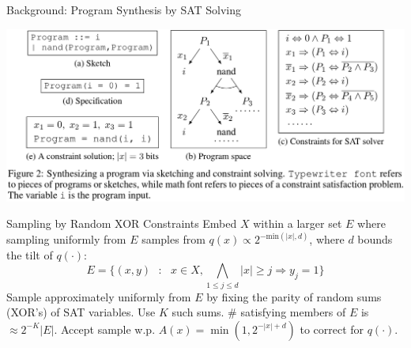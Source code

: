 \documentclass[final]{beamer}
\newlength{\onecolwid}
\newlength{\twocolwid}
\begin{document}
\begin{frame}[t]
\begin{columns}[t]
\begin{column}{\twocolwid} %

\begin{columns}[t,totalwidth=\twocolwid] %

\begin{column}{\onecolwid}\vspace{-.6in} %



  \begin{block}{Background: Program Synthesis by SAT Solving}

\hspace{-2.5cm}\includegraphics[width=45cm]{background.png}
  \end{block}

    \begin{block}{Sampling by Random XOR Constraints}
Embed $X$ within a larger set $E$ where sampling uniformly from $E$ samples from $  q(x) \propto     2^{-\text{min}(\lvert x \rvert,d) }$, where $d$ bounds the tilt of $q(\cdot)$:
  \begin{equation}
    E = \{(x,y) \text{ }:\text{ } x\in X,  \bigwedge_{1\leq j \leq d} \lvert x \rvert \geq j\Rightarrow y_j=1 \}
  \end{equation}
  Sample approximately uniformly from $E$ by fixing the parity of random sums (XOR's) of SAT variables. Use $K$ such sums. \# satisfying members of $E$ is $\approx 2^{-K}|E|$. Accept sample w.p. $A(x) = \min (1,2^{-|x| + d})$ to correct for $q(\cdot)$.


\end{block}
\end{column}
\end{columns}
\end{column}
\end{columns}
\end{frame}
\end{document}
